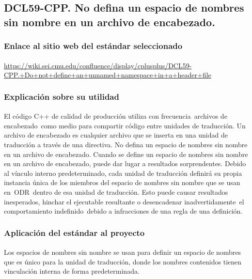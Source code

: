 	\subsection{DCL59-CPP. No defina un espacio de nombres sin nombre en un archivo de encabezado.}
	
		\subsubsection{Enlace al sitio web del estándar seleccionado}
			
			\paragraph{}\url{https://wiki.sei.cmu.edu/confluence/display/cplusplus/DCL59-CPP.+Do+not+define+an+unnamed+namespace+in+a+header+file}
		
		\subsubsection{Explicación sobre su utilidad}
		
			\paragraph{}El código C++ de calidad de producción utiliza con frecuencia archivos de encabezado como medio para compartir código entre unidades de traducción. Un archivo de encabezado es cualquier archivo que se inserta en una unidad de traducción a través de una directiva. No defina un espacio de nombres sin nombre en un archivo de encabezado. Cuando se define un espacio de nombres sin nombre en un archivo de encabezado, puede dar lugar a resultados sorprendentes. Debido al vínculo interno predeterminado, cada unidad de traducción definirá su propia instancia única de los miembros del espacio de nombres sin nombre que se usan en ODR dentro de esa unidad de traducción. Esto puede causar resultados inesperados, hinchar el ejecutable resultante o desencadenar inadvertidamente el comportamiento indefinido debido a infracciones de una regla de una definición.
		
		\subsubsection{Aplicación del estándar al proyecto}
		
			\paragraph{}Los espacios de nombres sin nombre se usan para definir un espacio de nombres que es único para la unidad de traducción, donde los nombres contenidos tienen vinculación interna de forma predeterminada.
			
